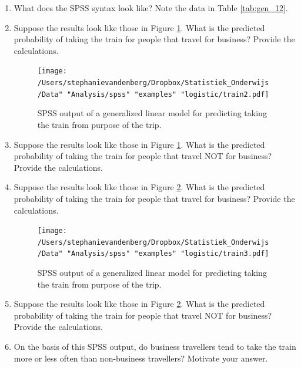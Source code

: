 \documentclass[]{report}\usepackage[]{graphicx}\usepackage[]{color}
\begin{document}
\begin{enumerate}

\item

What does the SPSS syntax look like? Note the data in Table \ref{tab:gen_12}.


\item
Suppose the results look like those in Figure \ref{fig:train2}. What is the predicted probability of taking the train for people that travel for business? Provide the calculations.


\begin{figure}[h]
    \begin{center}
       \texttt{[image: /Users/stephanievandenberg/Dropbox/Statistiek\_Onderwijs/Data" "Analysis/spss" "examples" "logistic/train2.pdf]}
    \end{center}
     \caption{SPSS output of a generalized linear model for predicting taking the train from purpose of the trip.}
    \label{fig:train2}
\end{figure}


\item Suppose the results look like those in Figure \ref{fig:train2}. What is the predicted probability of taking the train for people that travel NOT for business? Provide the calculations.



\item
Suppose the results look like those in Figure \ref{fig:train3}. What is the predicted probability of taking the train for people that travel for business? Provide the calculations.


\begin{figure}[h]
    \begin{center}
       \texttt{[image: /Users/stephanievandenberg/Dropbox/Statistiek\_Onderwijs/Data" "Analysis/spss" "examples" "logistic/train3.pdf]}
    \end{center}
     \caption{SPSS output of a generalized linear model for predicting taking the train from purpose of the trip.}
    \label{fig:train3}
\end{figure}


\item Suppose the results look like those in Figure \ref{fig:train3}. What is the predicted probability of taking the train for people that travel NOT for business? Provide the calculations.


\item On the basis of this SPSS output, do business travellers tend to take the train more or less often than non-business travellers? Motivate your answer.



\end{enumerate}
\end{document}
